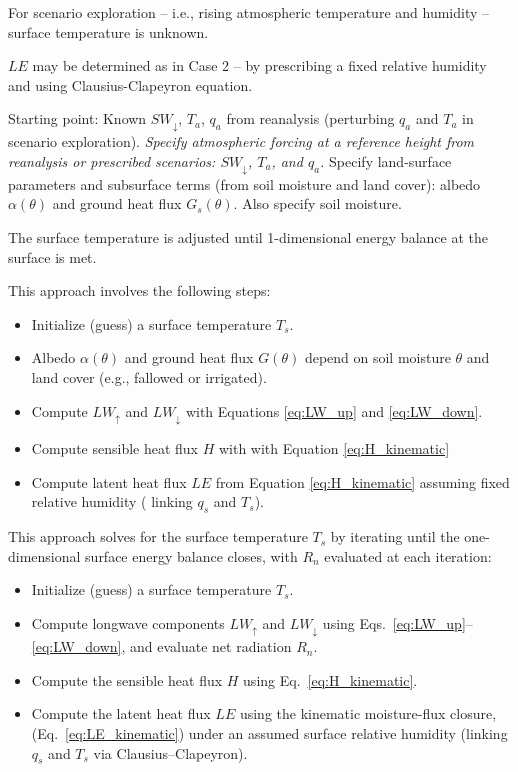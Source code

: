 \documentclass{article}
\begin{document}
    For scenario exploration -- i.e., rising atmospheric temperature and humidity –  surface temperature is unknown.  
    
    $LE$ may be determined as in Case 2 -- by prescribing a fixed relative humidity and using Clausius-Clapeyron equation. 
    
    Starting point: 
    Known $SW_\downarrow$, $T_a$, $q_a$ from reanalysis (perturbing $q_a$ and $T_a$ in scenario exploration). 
    \textit{Specify atmospheric forcing at a reference height from reanalysis or prescribed scenarios: $SW_{\downarrow}$, $T_a$, and $q_a$.}
    Specify land-surface parameters and subsurface terms (from soil moisture and land cover): albedo $\alpha(\theta)$ and ground heat flux $G_s(\theta)$. Also specify soil moisture. 
    
    The  surface temperature is adjusted until 1-dimensional energy balance at the surface is met. 
    
    This approach involves the following steps:
    
    \begin{itemize}
        \item Initialize (guess) a surface temperature $T_s$.
        \item    Albedo $\alpha(\theta)$ and ground heat flux $G(\theta)$ depend on soil moisture $\theta$ and land cover (e.g.,  fallowed or irrigated). 
        \item   Compute $LW_\uparrow$  and $LW_\downarrow$ with Equations \ref{eq:LW_up}  and \ref{eq:LW_down}.
        \item  Compute sensible heat flux $H$ with with Equation \ref{eq:H_kinematic}
        \item Compute latent heat flux $LE$ from Equation \ref{eq:H_kinematic} assuming fixed relative humidity ( linking $q_s$ and $T_s$).  
        \end{itemize} 
    
    This approach solves for the surface temperature $T_s$ by iterating until the one-dimensional surface energy balance closes, with $R_n$ evaluated at each iteration:
    
    \begin{itemize}
        \item Initialize (guess) a surface temperature $T_s$.
        \item Compute longwave components $LW_{\uparrow}$ and $LW_{\downarrow}$ using Eqs.~\ref{eq:LW_up}--\ref{eq:LW_down}, and evaluate net radiation $R_n$.
        \item Compute the sensible heat flux $H$ using Eq.~\ref{eq:H_kinematic}.
        \item Compute the latent heat flux $LE$ using  the kinematic moisture-flux closure, (Eq.~\ref{eq:LE_kinematic}) under an assumed surface relative humidity (linking $q_s$ and $T_s$ via Clausius--Clapeyron).
    \end{itemize}
    
\end{document}
